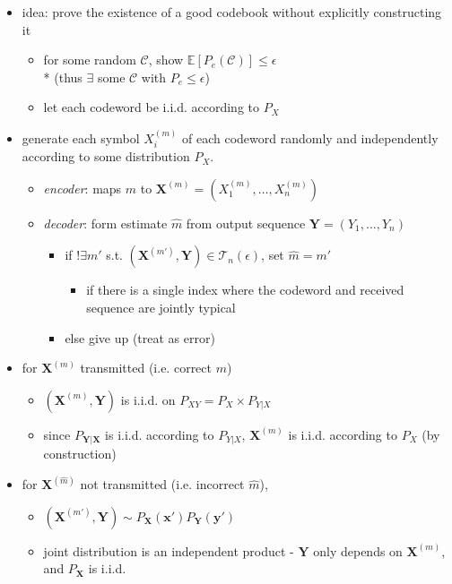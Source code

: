 \documentclass[10pt, landscape]{article}
\begin{document}
\begin{multicols*}{4}
  \begin{itemize}
    \item idea: prove the existence of a good codebook without explicitly constructing it 
      \begin{itemize}
        \item for some random $\mathcal{C}$, show $\mathbb{E}[P_e(\mathcal{C})] \leq \epsilon$ 
          \\* (thus $\exists$ some $\mathcal{C}$ with $P_e \leq \epsilon$)
        \item let each codeword be i.i.d. according to $P_X$
      \end{itemize}
    \item {} generate each symbol $X_i^{(m)}$ of each codeword randomly and independently according to some distribution $P_X$.
      \begin{itemize}
        \item \textit{encoder}: maps $m$ to $\mathbf{X}^{(m)} = (X_1^{(m)}, \dots, X_n^{(m)})$
        \item \textit{decoder}: form estimate  $\hat{m}$ from output sequence $\mathbf{Y} = (Y_1, \dots, Y_n)$
          \begin{itemize}
            \item if $!\exists m'$ s.t. $(\mathbf{X}^{(m')}, \mathbf{Y}) \in \mathcal{T}_n(\epsilon)$, set $\hat{m} = m'$
              \begin{itemize}
                \item if there is a single index where the codeword and received sequence are jointly typical
              \end{itemize}
            \item else give up (treat as error)
          \end{itemize}
      \end{itemize}
    \item for $\mathbf{X}^{(m)}$ transmitted (i.e. correct $m$)
      \begin{itemize}
        \item $(\mathbf{X}^{(m)}, \mathbf{Y})$ is i.i.d. on $P_{XY} = P_X \times P_{Y \vert X}$
        \item since $P_{\mathbf{Y} | \mathbf{X}}$ is i.i.d. according to $P_{Y \vert X}$, $\mathbf{X}^{(m)}$ is i.i.d. according to $P_X$ (by construction)
      \end{itemize}
    \item for $\mathbf{X}^{(\hat{m})}$ not transmitted (i.e. incorrect $\hat{m}$),
      \begin{itemize}
        \item $(\mathbf{X}^{(m')}, \mathbf{Y}) \sim P_\mathbf{X}(\mathbf{x}')P_\mathbf{Y}(\mathbf{y}')$
        \item joint distribution is an independent product - $\mathbf{Y}$ only depends on $\mathbf{X}^{(m)}$, and $P_{\mathbf{X}}$ is i.i.d.
      \end{itemize}
  \end{itemize}


\end{multicols*}
\end{document}
